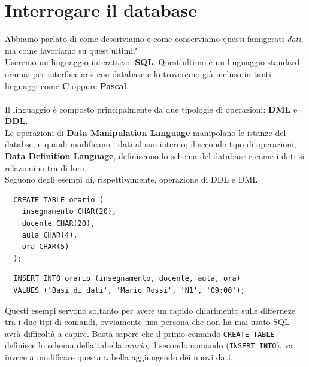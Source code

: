 \section{Interrogare il database}
Abbiamo parlato di come descriviamo e come conserviamo 
questi famigerati \textit{dati}, ma come lavoriamo su quest'ultimi? \\
Useremo un linguaggio interattivo: \textbf{SQL}. Quest'ultimo
è un linguaggio standard oramai per interfacciarsi con database e
lo troveremo già incluso in tanti linguaggi come \textbf{C} 
oppure \textbf{Pascal}.
\\
\\
Il linguaggio è composto principalmente da due tipologie di operazioni:
\textbf{DML} e \textbf{DDL}. \\
Le operazioni di \textbf{Data Manipulation Language} manipolano 
le istanze del databse, e quindi modificano i dati al suo interno;
il secondo tipo di operazioni, \textbf{Data Definition Language}, 
definiscono lo schema del database e come i dati si relazionino 
tra di loro. \\
Seguono degli esempi di, rispettivamente, operazione di DDL e DML

\begin{verbatim}
  CREATE TABLE orario (
    insegnamento CHAR(20),
    docente CHAR(20),
    aula CHAR(4),
    ora CHAR(5)
  );
\end{verbatim}

\begin{verbatim}
  INSERT INTO orario (insegnamento, docente, aula, ora)
  VALUES ('Basi di dati', 'Mario Rossi', 'N1', '09:00');
\end{verbatim}

Questi esempi servono soltanto per avere un rapido chiarimento sulle
differneze tra i due tipi di comandi, ovviamente una persona che non ha
mai usato SQL avrà difficoltà a capire. Basta sapere che il primo comando
\verb|CREATE TABLE| definisce lo schema della tabella \textit{orario},
il secondo comando (\verb|INSERT INTO|), va invece a modificare questa 
tabella aggiungendo dei nuovi dati.